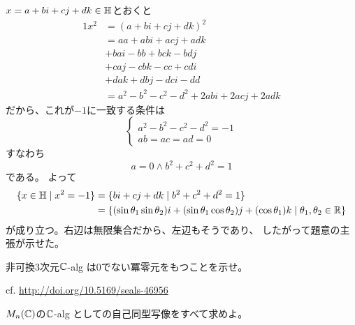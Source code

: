 \documentclass[report]{jlreq}
\begin{document}
\begin{answer}
    $x = a + bi + cj + dk \in \mathbb{H}$とおくと
    \begin{alignat}{1}
        x^2
            &= (a + bi + cj + dk)^2 \\
            &= aa + abi + acj + adk \\
            &+ bai -bb + bck - bdj \\
            &+ caj -cbk - cc + cdi \\
            &+ dak + dbj - dci - dd \\
            &= a^2 - b^2 - c^2 - d^2
                + 2abi + 2acj + 2adk
    \end{alignat}
    だから、これが$-1$に一致する条件は
    \begin{equation}
        \begin{cases}
            a^2 - b^2 - c^2 - d^2 = -1 \\
            ab = ac = ad = 0
        \end{cases}
    \end{equation}
    すなわち
    \begin{equation}
        a = 0 \wedge b^2 + c^2 + d^2 = 1
    \end{equation}
    である。
    よって
    \begin{alignat}{1}
        \{ x \in \mathbb{H} \mid x^2 = -1 \}
            &= \{ bi + cj + dk \mid b^2 + c^2 + d^2 = 1 \} \\
            &= \{
                (\sin\theta_1 \sin\theta_2) i
                + (\sin\theta_1 \cos\theta_2) j
                + (\cos\theta_1) k
                \mid 
                \theta_1, \theta_2 \in \mathbb{R}
            \}
    \end{alignat}
    が成り立つ。右辺は無限集合だから、左辺もそうであり、
    したがって題意の主張が示せた。
\end{answer}


\begin{problem}[代数学II 1.14]
    非可換$3$次元$\mathbb{C}$-alg は$0$でない冪零元をもつことを示せ。
\end{problem}

\begin{answer}
    cf. \url{http://doi.org/10.5169/seals-46956}
\end{answer}


\begin{problem}[代数学II 1.15]
    $M_n(\mathbb{C})$の$\mathbb{C}$-alg としての自己同型写像をすべて求めよ。
\end{problem}
\end{document}
